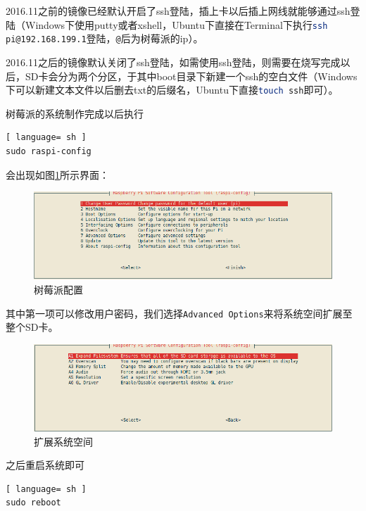 		\par 2016.11之前的镜像已经默认开启了ssh登陆，插上卡以后插上网线就能够通过ssh登陆（Windows下使用putty或者xshell，Ubuntu下直接在Terminal下执行\lstinline[language=sh]{ssh pi@192.168.199.1}登陆，\lstinline[language=sh]{@}后为树莓派的ip）。
		\par 2016.11之后的镜像默认关闭了ssh登陆，如需使用ssh登陆，则需要在烧写完成以后，SD卡会分为两个分区，于其中boot目录下新建一个ssh的空白文件（Windows下可以新建文本文件以后删去txt的后缀名，Ubuntu下直接\lstinline[language=sh]{touch ssh}即可）。
		\par 树莓派的系统制作完成以后执行
		\begin{lstlisting}[ language= sh ]
sudo raspi-config
		\end{lstlisting}
		\par 会出现如图\ref{fig:raspi_config}所示界面：
		\begin{figure}[htp]
			\centering
			\includegraphics[width=13cm]{figures/raspi-config.png}
			\caption{树莓派配置}
			\label{fig:raspi_config}
		\end{figure}
		\par 其中第一项可以修改用户密码，我们选择\lstinline{Advanced Options}来将系统空间扩展至整个SD卡。
		\begin{figure}[htp]
			\centering
			\includegraphics[width=13cm]{figures/raspi-config-expand-filesystem.png}
			\caption{扩展系统空间}
			\label{fig:raspi_config_expand_filesystem}
		\end{figure}
		\par 之后重启系统即可
		\begin{lstlisting}[ language= sh ]
sudo reboot
		\end{lstlisting}
